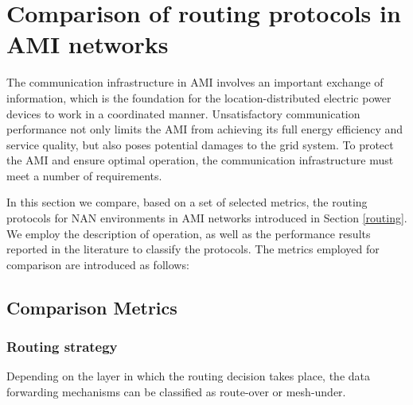 \documentclass[11pt,draftclsnofoot,onecolumn]{IEEEtran}
\begin{document}
\section{Comparison of routing protocols in AMI networks}\label{metrics}

The communication infrastructure in AMI involves an important exchange of information, which is the foundation for the location-distributed electric power devices to work in a coordinated manner. Unsatisfactory communication performance not only limits the AMI from achieving its full energy efficiency and service quality, but also poses potential damages to the grid system. To protect the AMI and ensure optimal operation, the communication infrastructure must meet a number of requirements.

In this section we compare, based on a set of selected metrics, the routing protocols for NAN environments in AMI networks introduced in Section \ref{routing}. We employ the description of operation, as well as the performance results reported in the literature to classify the protocols. The metrics employed for comparison are introduced as follows:

\subsection{Comparison Metrics}

\subsubsection{Routing strategy}
Depending on the layer in which the routing decision takes place, the data forwarding mechanisms can be classified as route-over or mesh-under. 
\end{document}
